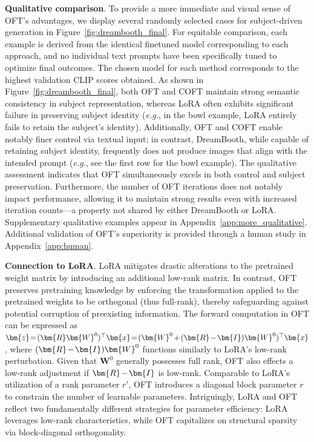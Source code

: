 \textbf{Qualitative comparison}. To provide a more immediate and visual sense of OFT’s advantages, we display several randomly selected cases for subject-driven generation in Figure~\ref{fig:dreambooth_final}. For equitable comparison, each example is derived from the identical finetuned model corresponding to each approach, and no individual text prompts have been specifically tuned to optimize final outcomes. The chosen model for each method corresponds to the highest validation CLIP scores obtained. As shown in Figure~\ref{fig:dreambooth_final}, both OFT and COFT maintain strong semantic consistency in subject representation, whereas LoRA often exhibits significant failure in preserving subject identity (\emph{e.g.}, in the bowl example, LoRA entirely fails to retain the subject’s identity). Additionally, OFT and COFT enable notably finer control via textual input; in contrast, DreamBooth, while capable of retaining subject identity, frequently does not produce images that align with the intended prompt (\emph{e.g.}, see the first row for the bowl example). The qualitative assessment indicates that OFT simultaneously excels in both control and subject preservation. Furthermore, the number of OFT iterations does not notably impact performance, allowing it to maintain strong results even with increased iteration counts—a property not shared by either DreamBooth or LoRA. Supplementary qualitative examples appear in Appendix~\ref{app:more_qualitative}. Additional validation of OFT’s superiority is provided through a human study in Appendix~\ref{app:human}.

\textbf{Connection to LoRA}. LoRA mitigates drastic alterations to the pretrained weight matrix by introducing an additional low-rank matrix. In contrast, OFT preserves pretraining knowledge by enforcing the transformation applied to the pretrained weights to be orthogonal (thus full-rank), thereby safeguarding against potential corruption of preexisting information. The forward computation in OFT can be expressed as $\thickmuskip=2mu \medmuskip=2mu \bm{z}=(\bm{R}\bm{W}^0)^\top\bm{x}=(\bm{W}^0+(\bm{R}-\bm{I})\bm{W}^0)^\top\bm{x}$, where $\thickmuskip=2mu \medmuskip=2mu (\bm{R}-\bm{I})\bm{W}^0$ functions similarly to LoRA's low-rank perturbation. Given that $\bm{W}^0$ generally possesses full rank, OFT also effects a low-rank adjustment if $\thickmuskip=2mu \medmuskip=2mu \bm{R}-\bm{I}$ is low-rank. Comparable to LoRA’s utilization of a rank parameter $r'$, OFT introduces a diagonal block parameter $r$ to constrain the number of learnable parameters. Intriguingly, LoRA and OFT reflect two fundamentally different strategies for parameter efficiency: LoRA leverages low-rank characteristics, while OFT capitalizes on structural sparsity via block-diagonal orthogonality.

